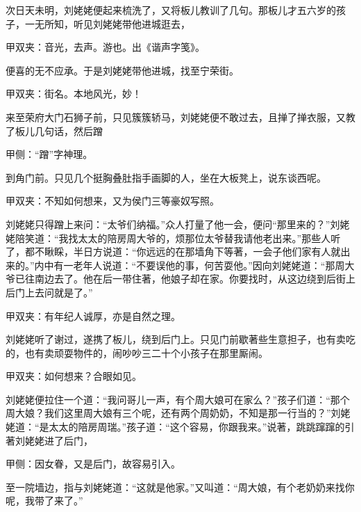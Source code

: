 \begin{parag}
    次日天未明，刘姥姥便起来梳洗了，又将板儿教训了几句。那板儿才五六岁的孩子，一无所知，听见刘姥姥带他进城逛去，\begin{note}甲双夹：音光，去声。游也。出《谐声字笺》。\end{note}便喜的无不应承。于是刘姥姥带他进城，找至宁荣街。\begin{note}甲双夹：街名。本地风光，妙！\end{note}来至荣府大门石狮子前，只见簇簇轿马，刘姥姥便不敢过去，且掸了掸衣服，又教了板儿几句话，然后蹭\begin{note}甲侧：“蹭”字神理。\end{note}到角门前。只见几个挺胸叠肚指手画脚的人，坐在大板凳上，说东谈西呢。\begin{note}甲双夹：不知如何想来，又为侯门三等豪奴写照。\end{note}刘姥姥只得蹭上来问：“太爷们纳福。”众人打量了他一会，便问“那里来的？”刘姥姥陪笑道：“我找太太的陪房周大爷的，烦那位太爷替我请他老出来。”那些人听了，都不瞅睬，半日方说道：“你远远的在那墙角下等著，一会子他们家有人就出来的。”内中有一老年人说道：“不要误他的事，何苦耍他。”因向刘姥姥道：“那周大爷已往南边去了。他在后一带住著，他娘子却在家。你要找时，从这边绕到后街上后门上去问就是了。”\begin{note}甲双夹：有年纪人诚厚，亦是自然之理。\end{note}
\end{parag}


\begin{parag}
    刘姥姥听了谢过，遂携了板儿，绕到后门上。只见门前歇著些生意担子，也有卖吃的，也有卖顽耍物件的，闹吵吵三二十个小孩子在那里厮闹。\begin{note}甲双夹：如何想来？合眼如见。\end{note}刘姥姥便拉住一个道：“我问哥儿一声，有个周大娘可在家么？”孩子们道：“那个周大娘？我们这里周大娘有三个呢，还有两个周奶奶，不知是那一行当的？”刘姥姥道：“是太太的陪房周瑞。”孩子道：“这个容易，你跟我来。”说著，跳跳蹿蹿的引著刘姥姥进了后门，\begin{note}甲侧：因女眷，又是后门，故容易引入。\end{note}至一院墙边，指与刘姥姥道：“这就是他家。”又叫道：“周大娘，有个老奶奶来找你呢，我带了来了。”
\end{parag}


